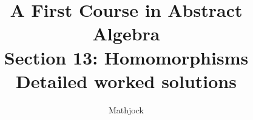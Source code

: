 
\title{\textbf{A First Course in Abstract Algebra}\\[0.3em]Section 13: Homomorphisms\\[0.3em]\large Detailed worked solutions}
\author{Mathjock}
\date{}

\maketitle
\bookinfo
\tableofcontents
\clearpage
\renewcommand{\thesection}{13}
\renewcommand{\theHsection}{fraleigh.13}


